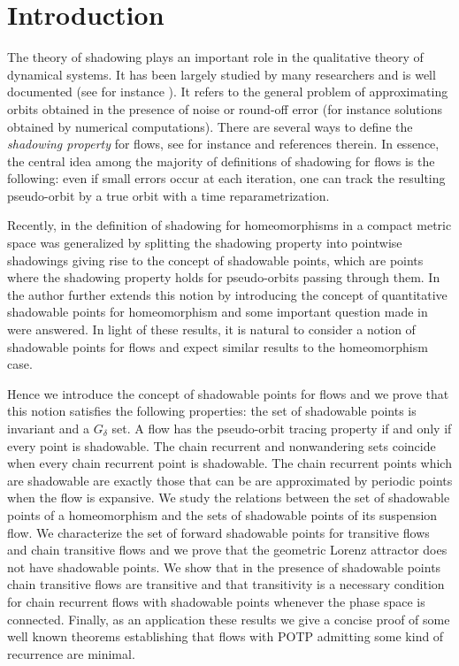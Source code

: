 \documentclass{amsart}
\theoremstyle{definition}
\begin{document}
\section{Introduction}

\noindent
The theory of shadowing plays an important role in the qualitative theory of dynamical systems.
It has been largely studied by many researchers and is well documented (see for instance \cite{Palmer2000}). It refers to the general problem of approximating orbits obtained in the presence of noise or round-off error (for instance solutions obtained by numerical computations). There are several ways to define the {\em shadowing property} for flows, see for instance \cite{Pilyugin2008} and references therein. In essence, the central idea among the majority of definitions of shadowing for flows is the following: even if small errors occur at each iteration, one can track the resulting pseudo-orbit by a true orbit with a time reparametrization. 

 
Recently, in \cite{Morales16} the definition of shadowing for homeomorphisms in a compact metric space was generalized by splitting the shadowing property into pointwise shadowings  giving rise to the concept of shadowable points, which are points where the shadowing property holds for pseudo-orbits passing through them. In \cite{Kawaguchi17} the author further extends this notion by introducing the concept of quantitative shadowable points for homeomorphism and some important question made in \cite{Morales16} were answered. In light of these results, it is natural to consider a notion of shadowable points for flows and expect similar results to the homeomorphism case. 

Hence we introduce the concept of shadowable points for flows and we prove that this notion satisfies the following properties: the set of shadowable points is invariant and a $G_{\delta}$ set. A flow has the pseudo-orbit tracing property if and only if every point is shadowable. The chain recurrent and nonwandering sets coincide when every chain recurrent point is shadowable. The chain recurrent points which are shadowable are exactly those that can be are approximated by periodic points when the flow is expansive.  We study the relations between the set of shadowable points of a homeomorphism and the sets of shadowable points of its suspension flow. We characterize the set of forward  shadowable points for transitive flows and chain transitive flows and we prove that the geometric Lorenz attractor does not have shadowable points. We show that in the presence of shadowable points chain transitive flows are transitive and that transitivity is a necessary condition for chain recurrent flows with shadowable points whenever the phase space is connected. Finally, as an application these results we give a concise proof of some well known theorems establishing that flows with POTP admitting some kind of recurrence are minimal.
\end{document}
